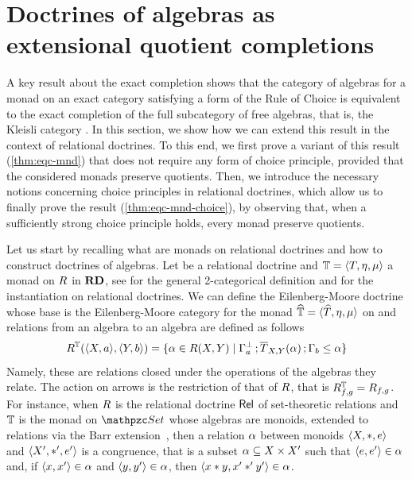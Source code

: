 
\section{Doctrines of algebras as extensional quotient completions} 
\label{sect:algebra} 


A key result about the exact completion shows that the category of algebras for a monad on an exact category satisfying a form of the Rule of Choice is equivalent to the exact completion of the full subcategory of free algebras, that is, the Kleisli category \cite{Vitale94}. 
In this section, we show how we can extend this result in the context of relational doctrines. 
To this end, we first prove a variant of this result (\cref{thm:eqc-mnd}) that does not require any form of choice principle, provided that the considered monads preserve quotients. 
Then, we introduce the necessary notions concerning choice principles in relational doctrines, which allow us to finally prove the result (\cref{thm:eqc-mnd-choice}), by observing that, when a sufficiently strong choice principle holds, every monad preserve quotients. 


Let us start by recalling what are monads on relational doctrines and how to construct doctrines of algebras. 
% 
Let \fun{\RDoc}{\bop\CC}{\Pos}  be a relational doctrine and $\mathbb{T} = {\langle T,\eta,\mu \rangle }$ a monad on $R$ in $\mathbf{RD}$,  see \cite{Street72} for  the general 2-categorical definition and \cite{DagninoP25tac} for the instantiation on relational doctrines. 
We can define the Eilenberg-Moore  doctrine \fun{\RDoc^\mnd}{\bop{\CC^{\fn\mnd}}}{\Pos} whose base is the Eilenberg-Moore category for the monad 
$\widehat{\mathbb{T}} = {\langle \widehat{T},\eta,\mu \rangle }$ on \CC and relations  from an algebra  to an algebra  are defined as follows
\[
R^{\mathbb{T}}({\langle X,a \rangle },{\langle Y,b \rangle })=\{\alpha\in R(X,Y)\mid \Gamma_{a}^{\bot}\mathop{\mathbf{;}}\overline{T}_{X,Y}(\alpha)\mathop{\mathbf{;}}\Gamma_{b}\leq \alpha\}
\]
Namely, these are relations closed under the operations of the algebras they relate. The action on arrows is the restriction of that of $R$, that is $R^{\mathbb{T}}_{f,g}=R_{f,g}$. 
 For instance, when $R$ is the relational doctrine $\mathsf{Rel}$ of set-theoretic relations and 
$\mathbb{T}$ is the monad on $\Set$ whose algebras are monoids, extended to relations via the Barr extension~\cite{Barr70}, 
then a relation $\alpha$ between monoids ${\langle X,\ast,e \rangle }$ and ${\langle X',\ast',e' \rangle }$ is a congruence, that is a subset 
$\alpha\subseteq X \times X'$ such that ${\langle e,e' \rangle }\in\alpha$ and, if ${\langle x,x' \rangle }\in\alpha$ and ${\langle y,y' \rangle }\in \alpha$, then ${\langle x\ast  y,x'\ast' y' \rangle }\in\alpha$.

